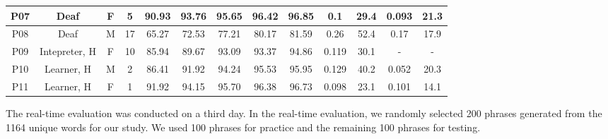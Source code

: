 \begin{table*}[t]
\begin{tabular}{cccc|ccccccc|cc}
\multicolumn{1}{c|}{P07}       & \multicolumn{1}{c|}{Deaf}           & \multicolumn{1}{c|}{F}               & 5             & \multicolumn{1}{c|}{90.93}          & \multicolumn{1}{c|}{93.76}          & \multicolumn{1}{c|}{95.65}          & \multicolumn{1}{c|}{96.42}          & \multicolumn{1}{c|}{96.85}          & \multicolumn{1}{c|}{0.1}            & 29.4          & \multicolumn{1}{c|}{0.093}          & 21.3          \\ \hline
\multicolumn{1}{c|}{P08}       & \multicolumn{1}{c|}{Deaf}           & \multicolumn{1}{c|}{M}               & 17            & \multicolumn{1}{c|}{65.27}          & \multicolumn{1}{c|}{72.53}          & \multicolumn{1}{c|}{77.21}          & \multicolumn{1}{c|}{80.17}          & \multicolumn{1}{c|}{81.59}          & \multicolumn{1}{c|}{0.26}           & 52.4          & \multicolumn{1}{c|}{0.17}           & 17.9          \\ \hline
\multicolumn{1}{c|}{P09}       & \multicolumn{1}{c|}{Intepreter, H}  & \multicolumn{1}{c|}{F}               & 10            & \multicolumn{1}{c|}{85.94}          & \multicolumn{1}{c|}{89.67}          & \multicolumn{1}{c|}{93.09}          & \multicolumn{1}{c|}{93.37}          & \multicolumn{1}{c|}{94.86}          & \multicolumn{1}{c|}{0.119}          & 30.1          & \multicolumn{1}{c|}{-}              & -             \\ \hline
\multicolumn{1}{c|}{P10}       & \multicolumn{1}{c|}{Learner, H}     & \multicolumn{1}{c|}{M}               & 2             & \multicolumn{1}{c|}{86.41}          & \multicolumn{1}{c|}{91.92}          & \multicolumn{1}{c|}{94.24}          & \multicolumn{1}{c|}{95.53}          & \multicolumn{1}{c|}{95.95}          & \multicolumn{1}{c|}{0.129}          & 40.2          & \multicolumn{1}{c|}{0.052}          & 20.3          \\ \hline
\multicolumn{1}{c|}{P11}       & \multicolumn{1}{c|}{Learner, H}     & \multicolumn{1}{c|}{F}               & 1             & \multicolumn{1}{c|}{91.92}          & \multicolumn{1}{c|}{94.15}          & \multicolumn{1}{c|}{95.70}          & \multicolumn{1}{c|}{96.38}          & \multicolumn{1}{c|}{96.73}          & \multicolumn{1}{c|}{0.098}          & 23.1          & \multicolumn{1}{c|}{0.101}          & 14.1          \\ \hline
\end{tabular}
\end{table*}
\label{fig:table2}
The real-time evaluation was conducted on a third day.  In the real-time evaluation, we randomly selected 200 phrases generated from the 1164 unique words for our study. We used 100 phrases for practice and the remaining 100 phrases for testing. 

